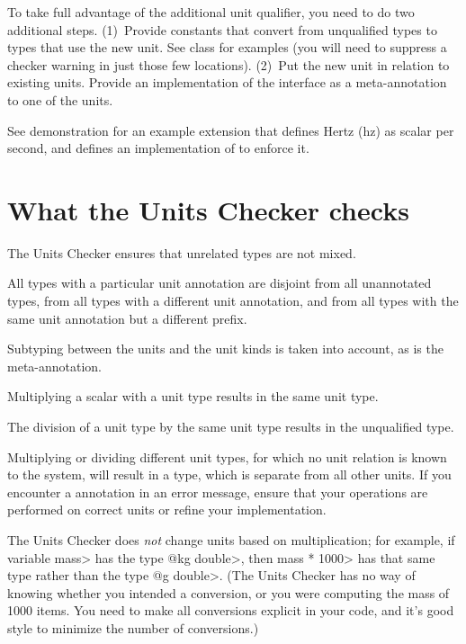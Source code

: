 To take full advantage of the additional unit qualifier, you need to
do two additional steps.
(1)~Provide constants that convert from unqualified types to types that use
the new unit.
See class  for examples (you will need to suppress a
checker warning in just those few locations).
(2)~Put the new unit in relation to existing units.
Provide an
implementation of the  interface as a
meta-annotation to one of the units.

See demonstration  for an example
extension that defines Hertz (hz) as scalar per second, and defines an
implementation of  to enforce it.



\section{What the Units Checker checks\label{units-checks}}

The Units Checker ensures that unrelated types are not mixed.

All types with a particular unit annotation are
disjoint from all unannotated types, from all types with a different unit
annotation, and from all types with the same unit annotation but a
different prefix.

Subtyping between the units and the unit kinds is taken into account,
as is the  meta-annotation.

Multiplying a scalar with a unit type results in the same unit type.

The division of a unit type by the same unit type
results in the unqualified type.

Multiplying or dividing different unit types, for which no unit
relation is known to the system, will result in a 
type, which is separate from all other units.
If you encounter a  annotation in an error message,
ensure that your operations are performed on correct units or refine
your  implementation.

The Units Checker does \emph{not} change units based on multiplication; for
example, if variable \<mass> has the type \<@kg double>, then \<mass *
1000> has that same type rather than the type \<@g double>.  (The Units
Checker has no way of knowing whether you intended a conversion, or you
were computing the mass of 1000 items.  You need to make all conversions
explicit in your code, and it's good style to minimize the number of
conversions.)


